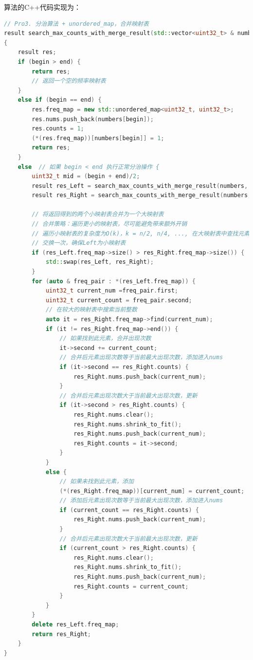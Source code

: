 \documentclass[UTF8,12pt,a4paper]{ctexart}
\begin{document}
算法的C++代码实现为：
\begin{lstlisting}[language={C++}, basicstyle=\ttfamily\footnotesize]
// Pro3. 分治算法 + unordered_map，合并映射表
result search_max_counts_with_merge_result(std::vector<uint32_t> & numbers, uint32_t begin, uint32_t end)
{
    result res;
    if (begin > end) {
        return res;
        // 返回一个空的频率映射表
    }
    else if (begin == end) {
        res.freq_map = new std::unordered_map<uint32_t, uint32_t>;
        res.nums.push_back(numbers[begin]);
        res.counts = 1;
        (*(res.freq_map))[numbers[begin]] = 1;
        return res;
    }
    else  // 如果 begin < end 执行正常分治操作 {
        uint32_t mid = (begin + end)/2;
        result res_Left = search_max_counts_with_merge_result(numbers, begin, mid);
        result res_Right = search_max_counts_with_merge_result(numbers, mid + 1, end);

        // 将返回得到的两个小映射表合并为一个大映射表
        // 合并策略：遍历更小的映射表，尽可能避免带来额外开销
        // 遍历小映射表的复杂度为O(k)，k = n/2, n/4, ..., 在大映射表中查找元素的复杂度为O(1)
        // 交换一次，确保Left为小映射表
        if (res_Left.freq_map->size() > res_Right.freq_map->size()) {
            std::swap(res_Left, res_Right);
        }
        for (auto & freq_pair : *(res_Left.freq_map)) {
            uint32_t current_num =freq_pair.first;
            uint32_t current_count = freq_pair.second;
            // 在较大的映射表中搜索当前整数
            auto it = res_Right.freq_map->find(current_num);
            if (it != res_Right.freq_map->end()) {
                // 如果找到此元素，合并出现次数
                it->second += current_count;
                // 合并后元素出现次数等于当前最大出现次数，添加进入nums
                if (it->second == res_Right.counts) {
                    res_Right.nums.push_back(current_num);
                }
                // 合并后元素出现次数大于当前最大出现次数，更新
                if (it->second > res_Right.counts) {
                    res_Right.nums.clear();
                    res_Right.nums.shrink_to_fit();
                    res_Right.nums.push_back(current_num);
                    res_Right.counts = it->second;
                }
            }
            else {
                // 如果未找到此元素，添加
                (*(res_Right.freq_map))[current_num] = current_count;
                // 添加后元素出现次数等于当前最大出现次数，添加进入nums
                if (current_count == res_Right.counts) {
                    res_Right.nums.push_back(current_num);
                }
                // 合并后元素出现次数大于当前最大出现次数，更新
                if (current_count > res_Right.counts) {
                    res_Right.nums.clear();
                    res_Right.nums.shrink_to_fit();
                    res_Right.nums.push_back(current_num);
                    res_Right.counts = current_count;
                }
            }
        }
        delete res_Left.freq_map;
        return res_Right;
    }
}
\end{lstlisting}
\end{document}
